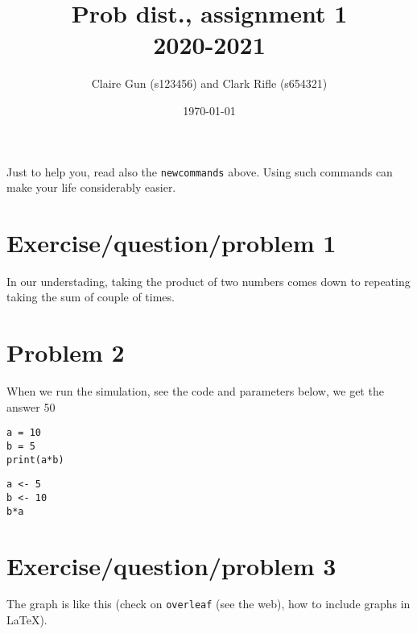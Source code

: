 \documentclass[a4paper,11pt]{article}
\author{Claire Gun (s123456) and Clark Rifle (s654321)}
\date{\today}
\title{Prob dist., assignment 1\\
  2020-2021
  }
\newcommand{\1}[1]{\,I_{#1}} %
\begin{document}
\maketitle

Just to help you, read also the \verb|newcommands| above. Using such commands can make your life considerably easier.

\section{Exercise/question/problem 1}

In our understading, taking the product of two numbers comes down to repeating taking the sum of couple of times.

\section{Problem 2}

When we run the simulation, see the code and parameters below, we get the answer 50

\begin{verbatim}
a = 10
b = 5
print(a*b)
\end{verbatim}


\begin{verbatim}
a <- 5
b <- 10
b*a
\end{verbatim}

\section{Exercise/question/problem 3}

The graph is like this (check on \texttt{overleaf} (see the web), how to include graphs in \LaTeX).
\end{document}
